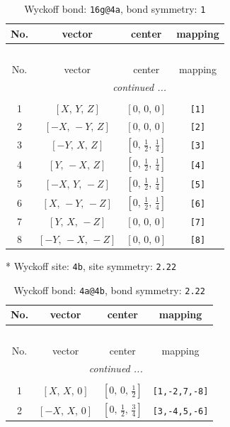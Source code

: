 \documentclass[fleqn,8pt]{jsarticle}
\begin{document}
\renewcommand{\arraystretch}{1.2}
\begin{longtable}{cccc}
\caption{Wyckoff bond: {\tt 16g@4a}, bond symmetry: {\tt 1}}
 \\
 \hline \hline
No. & vector & center & mapping \\ \hline \endfirsthead

\multicolumn{3}{l}{\tablename\ \thetable{}} \\
 \hline \hline
No. & vector & center & mapping \\ \hline \endhead

 \hline \hline
\multicolumn{3}{r}{\footnotesize\it continued ...} \\ \endfoot

 \hline \hline
\multicolumn{3}{r}{} \\ \endlastfoot

1 & $\left[ X,\, Y,\, Z \right]$ & $\left[ 0,\, 0,\, 0 \right]$ & {\tt [1]} \\ \hline
2 & $\left[ - X,\, - Y,\, Z \right]$ & $\left[ 0,\, 0,\, 0 \right]$ & {\tt [2]} \\ \hline
3 & $\left[ - Y,\, X,\, Z \right]$ & $\left[ 0,\, \frac{1}{2},\, \frac{1}{4} \right]$ & {\tt [3]} \\ \hline
4 & $\left[ Y,\, - X,\, Z \right]$ & $\left[ 0,\, \frac{1}{2},\, \frac{1}{4} \right]$ & {\tt [4]} \\ \hline
5 & $\left[ - X,\, Y,\, - Z \right]$ & $\left[ 0,\, \frac{1}{2},\, \frac{1}{4} \right]$ & {\tt [5]} \\ \hline
6 & $\left[ X,\, - Y,\, - Z \right]$ & $\left[ 0,\, \frac{1}{2},\, \frac{1}{4} \right]$ & {\tt [6]} \\ \hline
7 & $\left[ Y,\, X,\, - Z \right]$ & $\left[ 0,\, 0,\, 0 \right]$ & {\tt [7]} \\ \hline
8 & $\left[ - Y,\, - X,\, - Z \right]$ & $\left[ 0,\, 0,\, 0 \right]$ & {\tt [8]} \\
\end{longtable}
* Wyckoff site: {\tt 4b}, site symmetry: {\tt 2.22}
\renewcommand{\arraystretch}{1.2}
\begin{longtable}{cccc}
\caption{Wyckoff bond: {\tt 4a@4b}, bond symmetry: {\tt 2.22}}
 \\
 \hline \hline
No. & vector & center & mapping \\ \hline \endfirsthead

\multicolumn{3}{l}{\tablename\ \thetable{}} \\
 \hline \hline
No. & vector & center & mapping \\ \hline \endhead

 \hline \hline
\multicolumn{3}{r}{\footnotesize\it continued ...} \\ \endfoot

 \hline \hline
\multicolumn{3}{r}{} \\ \endlastfoot

1 & $\left[ X,\, X,\, 0 \right]$ & $\left[ 0,\, 0,\, \frac{1}{2} \right]$ & {\tt [1,-2,7,-8]} \\ \hline
2 & $\left[ - X,\, X,\, 0 \right]$ & $\left[ 0,\, \frac{1}{2},\, \frac{3}{4} \right]$ & {\tt [3,-4,5,-6]} \\
\end{longtable}
\end{document}
